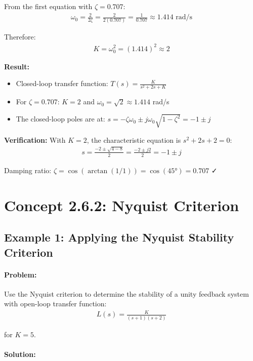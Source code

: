 \documentclass[11pt,a4paper]{article}
\begin{document}
From the first equation with $\zeta = 0.707$:
\begin{align}
\omega_0 = \frac{2}{2\zeta} = \frac{2}{2(0.707)} = \frac{1}{0.707} \approx 1.414 \text{ rad/s}
\end{align}

Therefore:
\begin{align}
K = \omega_0^2 = (1.414)^2 \approx 2
\end{align}

\textbf{Result:}
\begin{itemize}
\item Closed-loop transfer function: $T(s) = \frac{K}{s^2 + 2s + K}$
\item For $\zeta = 0.707$: $K = 2$ and $\omega_0 = \sqrt{2} \approx 1.414$ rad/s
\item The closed-loop poles are at: $s = -\zeta\omega_0 \pm j\omega_0\sqrt{1-\zeta^2} = -1 \pm j$
\end{itemize}

\textbf{Verification:} With $K = 2$, the characteristic equation is $s^2 + 2s + 2 = 0$:
\begin{align}
s = \frac{-2 \pm \sqrt{4-8}}{2} = \frac{-2 \pm j2}{2} = -1 \pm j
\end{align}

Damping ratio: $\zeta = \cos(\arctan(1/1)) = \cos(45°) = 0.707$ ✓

\section{Concept 2.6.2: Nyquist Criterion}

\subsection{Example 1: Applying the Nyquist Stability Criterion}

\paragraph{Problem:} Use the Nyquist criterion to determine the stability of a unity feedback system with open-loop transfer function:
\begin{align}
L(s) = \frac{K}{(s+1)(s+2)}
\end{align}

for $K = 5$.

\paragraph{Solution:}
\end{document}
